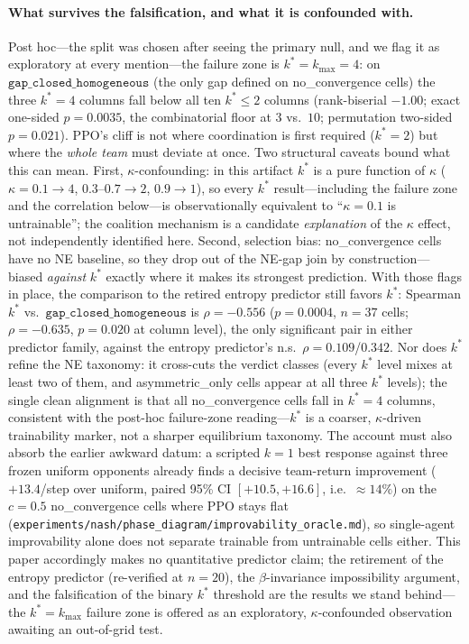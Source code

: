 \documentclass{anvil-paper}
\begin{document}
\paragraph{What survives the falsification, and what it is confounded
with.}
Post hoc---the split was chosen after seeing the primary null, and we
flag it as exploratory at every mention---the failure zone is
$k^{*}{=}k_{\max}{=}4$: on $\texttt{gap\_closed\_homogeneous}$ (the
only gap defined on \textsf{no\_convergence} cells) the three
$k^{*}{=}4$ columns fall below all ten $k^{*}{\leq}2$ columns
(rank-biserial $-1.00$; exact one-sided $p{=}0.0035$, the
combinatorial floor at $3$ vs.\ $10$; permutation two-sided
$p{=}0.021$). PPO's cliff is not where coordination is first required
($k^{*}{=}2$) but where the \emph{whole team} must deviate at once.
Two structural caveats bound what this can mean. First,
$\kappa$-confounding: in this artifact $k^{*}$ is a pure function of
$\kappa$ ($\kappa{=}0.1{\to}4$, $0.3$--$0.7{\to}2$, $0.9{\to}1$), so
every $k^{*}$ result---including the failure zone and the correlation
below---is observationally equivalent to ``$\kappa{=}0.1$ is
untrainable''; the coalition mechanism is a candidate
\emph{explanation} of the $\kappa$ effect, not independently
identified here. Second, selection bias: \textsf{no\_convergence}
cells have no NE baseline, so they drop out of the NE-gap join by
construction---biased \emph{against} $k^{*}$ exactly where it makes
its strongest prediction. With those flags in place, the comparison to
the retired entropy predictor still favors $k^{*}$: Spearman $k^{*}$
vs.\ $\texttt{gap\_closed\_homogeneous}$ is $\rho{=}-0.556$
($p{=}0.0004$, $n{=}37$ cells; $\rho{=}-0.635$, $p{=}0.020$ at column
level), the only significant pair in either predictor family, against
the entropy predictor's n.s.\ $\rho{=}0.109$/$0.342$. Nor does
$k^{*}$ refine the NE taxonomy: it cross-cuts the verdict classes
(every $k^{*}$ level mixes at least two of them, and
\textsf{asymmetric\_only} cells appear at all three $k^{*}$ levels);
the single clean alignment is that all \textsf{no\_convergence} cells
fall in $k^{*}{=}4$ columns, consistent with the post-hoc failure-zone
reading---$k^{*}$ is a coarser, $\kappa$-driven trainability marker,
not a sharper equilibrium taxonomy. The account must also absorb the earlier awkward datum: a
scripted $k{=}1$ best response against three frozen uniform opponents
already finds a decisive team-return improvement ($+13.4$/step over
uniform, paired 95\% CI $[+10.5, +16.6]$, i.e.\ ${\approx}14\%$) on the
$c{=}0.5$
\textsf{no\_convergence} cells where PPO stays flat
(\texttt{experiments/nash/phase\_diagram/improvability\_oracle.md}), so
single-agent improvability alone does not separate trainable from
untrainable cells either. This paper accordingly makes no quantitative
predictor claim; the retirement of the entropy predictor (re-verified
at $n{=}20$), the $\beta$-invariance impossibility argument, and the
falsification of the binary $k^{*}$ threshold are the results we stand
behind---the $k^{*}{=}k_{\max}$ failure zone is offered as an
exploratory, $\kappa$-confounded observation awaiting an out-of-grid
test.
\end{document}
